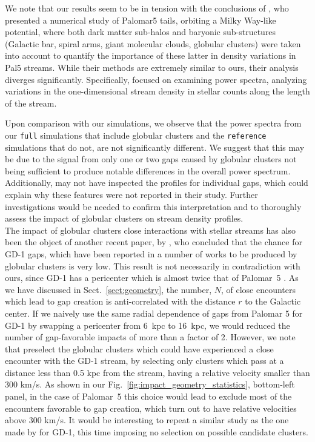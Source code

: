 \documentclass{aa}
\begin{document}
  We note that our results seem to be in tension with the conclusions of \citet{2019MNRAS.484.2009B}, who presented a numerical study of Palomar5 tails, orbiting a Milky Way-like potential, where both dark matter sub-halos and baryonic sub-structures (Galactic bar, spiral arms, giant molecular clouds, globular clusters) were taken into account to quantify the importance of these latter in density variations in Pal5 streams. While their methods are extremely similar to ours, their analysis diverges significantly. Specifically, \citet{2019MNRAS.484.2009B} focused on examining power spectra, analyzing variations in the one-dimensional stream density in stellar counts along the length of the stream. 

  Upon comparison with our simulations, we observe that the power spectra from our \texttt{full} simulations that include globular clusters and the \texttt{reference} simulations that do not, are not significantly different. We suggest that this may be due to the signal from only one or two gaps caused by globular clusters not being sufficient to produce notable differences in the overall power spectrum. Additionally, \citet{2022ApJ...926..107M} may not have inspected the profiles for individual gaps, which could explain why these features were not reported in their study. Further investigations would be needed to confirm this interpretation and to thoroughly assess the impact of globular clusters on stream density profiles. \\

  The impact of globular clusters close interactions with stellar streams has also been the object of another recent paper, by \citet{2022ApJ...941..129D}, who concluded that the chance for GD-1 gaps, which have been reported in a number of works \citep[see, for example, ][]{2019ApJ...880...38B,2018MNRAS.477.1893D,2020AAS...23533607D} to be produced by globular clusters is very low. This result is not necessarily in contradiction with ours, since GD-1 has a pericenter which is almost twice that of Palomar~5 \citep[see, for example][]{2019MNRAS.486.2995M}. As we have discussed in Sect.~\ref{sect:geometry}, the number, $N$, of close encounters which lead to gap creation is anti-correlated with the distance $r$ to the Galactic center. If we naively use the same radial dependence of gaps from Palomar 5 for GD-1 by swapping a pericenter from 6~kpc to 16~kpc, we would reduced the number of gap-favorable impacts of more than a factor of 2. However, we note that \citet{2022ApJ...941..129D} preselect the globular clusters which could have experienced a close encounter with the GD-1 stream, by selecting only clusters which pass at a distance less than 0.5 kpc from the stream, having a relative velocity smaller than  300 km/s. As shown in our Fig.~\ref{fig:impact_geometry_statistics}, bottom-left panel, in the case of Palomar~5 this choice would lead to exclude most of the encounters favorable to gap creation, which turn out to have relative velocities above 300 km/s. It would be interesting to repeat a similar study as the one made by \citet{2022ApJ...941..129D} for GD-1, this time imposing no selection on possible candidate clusters.\\
  
\end{document}

